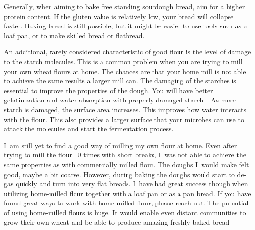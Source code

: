 Generally, when aiming to
bake free standing sourdough bread, aim for a higher protein content. If the
gluten value is relatively low, your bread will collapse faster. Baking bread
is still possible, but it might be easier to use tools such as a loaf pan, or
to make skilled bread or flatbread.

An additional, rarely considered characteristic of good flour is the level of damage to the
starch molecules. This is a common problem when you are trying to mill your own wheat flours at
home. The chances are that your home mill is not able to achieve the same results
a larger mill can. The damaging of the starches is essential to improve the
properties of the dough. You will have better gelatinization and water
absorption with properly damaged starch~\cite{starch+damage+flour}. As more
starch is damaged, the surface area increases. This improves how water interacts with the flour.
This also provides a larger surface that your microbes can use to attack the molecules
and start the fermentation process.

I~am still
yet to find a good way of milling my own flour at home. Even after trying to
mill the flour 10 times with short breaks, I~was not able to achieve the same
properties as with commercially milled flour. The doughs I~would make felt
good, maybe a bit coarse. However, during baking the doughs would start to
de-gas quickly and turn into very flat breads. I~have had great success though when
utilizing home-milled flour together with a loaf pan or as a pan bread. If you
have found great ways to work with home-milled flour, please reach out. The potential
of using home-milled flours is huge. It would enable even distant communities
to grow their own wheat and be able to produce amazing freshly baked bread.
